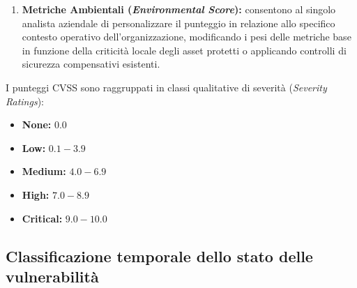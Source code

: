 \documentclass[../../main.tex]{subfiles}
\begin{document}
\begin{itemize}
\begin{enumerate}
        \item \textbf{Metriche Ambientali (\textit{Environmental Score}):} consentono al singolo analista aziendale di personalizzare il punteggio in relazione allo specifico contesto operativo dell'organizzazione, modificando i pesi delle metriche base in funzione della criticità locale degli asset protetti o applicando controlli di sicurezza compensativi esistenti.
    \end{enumerate}
\end{itemize}

I punteggi CVSS sono raggruppati in classi qualitative di severità (\textit{Severity Ratings}):
\begin{itemize}
    \item \textbf{None:} $0.0$
    \item \textbf{Low:} $0.1 - 3.9$
    \item \textbf{Medium:} $4.0 - 6.9$
    \item \textbf{High:} $7.0 - 8.9$
    \item \textbf{Critical:} $9.0 - 10.0$
\end{itemize}

\subsection{Classificazione temporale dello stato delle vulnerabilità}
\label{subsec:classificazione_temporale_vuln}
\end{document}
